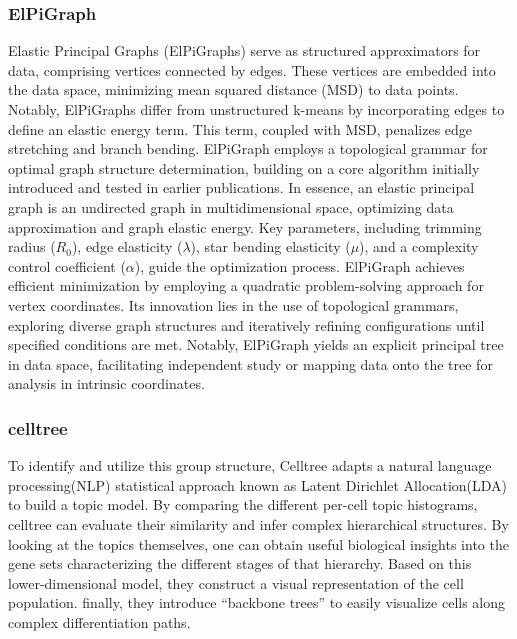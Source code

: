 \subsubsection{ElPiGraph}
 Elastic Principal Graphs (ElPiGraphs)\citep{albergante2020ElPiGraph} serve as structured approximators for data, comprising vertices connected by edges. These vertices are embedded into the data space, minimizing mean squared distance (MSD) to data points. Notably, ElPiGraphs differ from unstructured k-means by incorporating edges to define an elastic energy term. This term, coupled with MSD, penalizes edge stretching and branch bending. ElPiGraph employs a topological grammar for optimal graph structure determination, building on a core algorithm initially introduced and tested in earlier publications\citep{gorban2007topological}. In essence, an elastic principal graph is an undirected graph in multidimensional space, optimizing data approximation and graph elastic energy. Key parameters, including trimming radius ($R_0$), edge elasticity ($\lambda$), star bending elasticity ($\mu$), and a complexity control coefficient ($\alpha$), guide the optimization process. ElPiGraph achieves efficient minimization by employing a quadratic problem-solving approach for vertex coordinates. Its innovation lies in the use of topological grammars, exploring diverse graph structures and iteratively refining configurations until specified conditions are met. Notably, ElPiGraph yields an explicit principal tree in data space, facilitating independent study or mapping data onto the tree for analysis in intrinsic coordinates. 
\subsubsection{celltree}
 To identify and utilize this group structure, Celltree\citep{duverle2016celltree} adapts a natural language processing(NLP) statistical approach known as Latent Dirichlet Allocation(LDA) to build a topic model. By comparing the different per-cell topic histograms, celltree can evaluate their similarity and infer complex hierarchical structures. By looking at the topics themselves, one can obtain useful biological insights into the gene sets characterizing the different stages of that hierarchy. Based on this lower-dimensional model, they construct a visual representation of the cell population. finally, they introduce “backbone trees” to easily visualize cells along complex differentiation paths.
